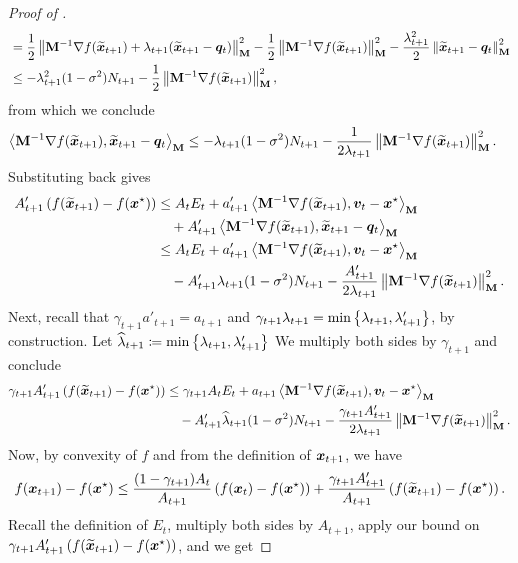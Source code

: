 \begin{proof}[Proof of ]
\begin{align*}
    &= \frac{1}{2}\left\lVert \mathbf{M}^{-1}\nabla f(\widetilde{\bm{x}}_{t+1})+\lambda_{t+1}(\widetilde{\bm{x}}_{t+1}-\bm{q}_t) \right\rVert_{\mathbf{M}}^2 - \frac{1}{2}\left\lVert \mathbf{M}^{-1}\nabla f(\widetilde{\bm{x}}_{t+1}) \right\rVert_{\mathbf{M}}^2-\frac{\lambda_{t+1}^2}{2}\left\lVert \widetilde{\bm{x}}_{t+1}-\bm{q}_t \right\rVert_{\mathbf{M}}^2 \\
    &\le -\lambda_{t+1}^2(1-\sigma^2)N_{t+1}-\frac{1}{2}\left\lVert \mathbf{M}^{-1}\nabla f(\widetilde{\bm{x}}_{t+1}) \right\rVert_{\mathbf{M}}^2,
\end{align*}
from which we conclude
\begin{align*}
    \left\langle \mathbf{M}^{-1}\nabla f(\widetilde{\bm{x}}_{t+1}),\widetilde{\bm{x}}_{t+1}-\bm{q}_t \right\rangle_{\mathbf{M}} &\le -\lambda_{t+1}(1-\sigma^2)N_{t+1}-\frac{1}{2\lambda_{t+1}}\left\lVert \mathbf{M}^{-1}\nabla f(\widetilde{\bm{x}}_{t+1}) \right\rVert_{\mathbf{M}}^2.
\end{align*}
Substituting back gives
\begin{align*}
    A_{t+1}'\left(f(\widetilde{\bm{x}}_{t+1})-f(\bm{x}^{\star})\right) &\le A_tE_t+a_{t+1}'\left\langle \mathbf{M}^{-1}\nabla f(\widetilde{\bm{x}}_{t+1}), \bm{v}_t-\bm{x}^{\star} \right\rangle_{\mathbf{M}}\\
    &\quad +A_{t+1}'\left\langle \mathbf{M}^{-1}\nabla f(\widetilde{\bm{x}}_{t+1}),\widetilde{\bm{x}}_{t+1}-\bm{q}_t \right\rangle_{\mathbf{M}} \\
    &\le A_tE_t+a_{t+1}'\left\langle \mathbf{M}^{-1}\nabla f(\widetilde{\bm{x}}_{t+1}), \bm{v}_t-\bm{x}^{\star} \right\rangle_{\mathbf{M}}\\
    &\quad -A_{t+1}'\lambda_{t+1}(1-\sigma^2)N_{t+1}-\frac{A_{t+1}'}{2\lambda_{t+1}}\left\lVert \mathbf{M}^{-1}\nabla f(\widetilde{\bm{x}}_{t+1}) \right\rVert_{\mathbf{M}}^2.
\end{align*}
Next, recall that $\gamma_{t+1}a'_{t+1}=a_{t+1}$ and $\gamma_{t+1}\lambda_{t+1}=\min\left\{\lambda_{t+1},\lambda_{t+1}'\right\}$, by construction. Let $\widehat{\lambda}_{t+1} \coloneqq \min\left\{\lambda_{t+1},\lambda_{t+1}'\right\}$ We multiply both sides by $\gamma_{t+1}$ and conclude
\begin{align*}
    \gamma_{t+1}A_{t+1}'\left(f(\widetilde{\bm{x}}_{t+1})-f(\bm{x}^{\star})\right)&\le \gamma_{t+1}A_tE_t+a_{t+1}\left\langle \mathbf{M}^{-1}\nabla f(\widetilde{\bm{x}}_{t+1}), \bm{v}_t-\bm{x}^{\star} \right\rangle_{\mathbf{M}}\\
    &\quad -A_{t+1}'\widehat{\lambda}_{t+1}(1-\sigma^2)N_{t+1}-\frac{\gamma_{t+1}A_{t+1}'}{2\lambda_{t+1}}\left\lVert \mathbf{M}^{-1}\nabla f(\widetilde{\bm{x}}_{t+1}) \right\rVert_{\mathbf{M}}^2. 
\end{align*}
Now, by convexity of $f$ and from the definition of $\bm{x}_{t+1}$, we have
\begin{align*}
    f(\bm{x}_{t+1})-f(\bm{x}^{\star}) \le \frac{(1-\gamma_{t+1})A_t}{A_{t+1}}\left(f(\bm{x}_{t})-f(\bm{x}^{\star})\right)+\frac{\gamma_{t+1}A_{t+1}'}{A_{t+1}}\left(f(\widetilde{\bm{x}}_{t+1})-f(\bm{x}^{\star})\right).
\end{align*}
Recall the definition of $E_t$, multiply both sides by $A_{t+1}$, apply our bound on $\gamma_{t+1}A_{t+1}'\left(f(\widetilde{\bm{x}}_{t+1})-f(\bm{x}^{\star})\right)$, and we get

\end{proof}
